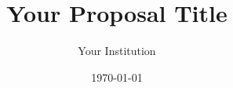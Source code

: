 \documentclass[aps, pra, preprint, 11pt, amsmath, amssymb, notitlepage, nofootinbib]{revtex4-2}
\begin{document}
\title{Your Proposal Title}
\author{Your Institution}
\date{\today}
\maketitle



\end{document}
